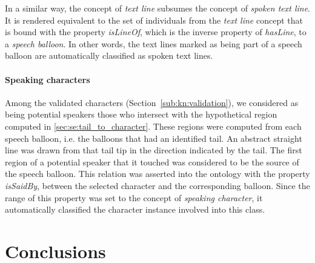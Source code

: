In a similar way, the concept of \textit{text line} subsumes the concept of \textit{spoken text line}.
It is rendered equivalent to the set of individuals from the \textit{text line} concept that is bound with the property \textit{isLineOf}, which is the inverse property of \textit{hasLine}, to a \textit{speech balloon}.
In other words, the text lines marked as being part of a speech balloon are automatically classified as spoken text lines.


\paragraph{Speaking characters} %
\label{sub:inference_of_the_speaking_characters}
Among the validated characters (Section~\ref{sub:kn:validation}), we considered as being potential speakers those who intersect with the hypothetical region computed in \ref{sec:se:tail_to_character}.
These regions were computed from each speech balloon, i.e. the balloons that had an identified tail.
An abstract straight line was drawn from that tail tip in the direction indicated by the tail.
The first region of a potential speaker that it touched was considered to be the source of the speech balloon.
This relation was asserted into the ontology with the property \textit{isSaidBy}, between the selected character and the corresponding balloon.
Since the range of this property was set to the concept of \textit{speaking character}, it automatically classified the character instance involved into this class.





\section{Conclusions}
\label{sec:kn:conclusion}

